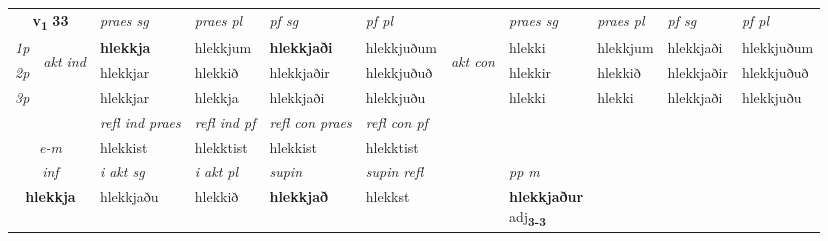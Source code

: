 \noindent
\begin{tabular}{lllllllllll} \toprule
\multicolumn{2}{c}{\textbf{v{\textsubscript{1}}} \Large{\textbf{33}}}  &  \textit{praes sg}  & \textit{praes pl}  &\textit{ pf sg} & \textit{pf pl} &  &  \textit{praes sg}  & \textit{praes pl}  & \textit{pf sg} & \textit{pf pl } \\*
	\cmidrule{3-6} \cmidrule{8-11}
 {\textit{1p}} & \multirow{3}{*}{\begin{turn}{90}\textit{akt ind}\end{turn}} & \textbf{hlekkja} & hlekkjum & \textbf{hlekkjaði} & hlekkjuðum & \multirow{3}{*}{\begin{turn}{90}\textit{akt con}\end{turn}} &hlekki & hlekkjum & hlekkjaði & hlekkjuðum\\*
 {\textit{2p}} &  &  hlekkjar  & hlekkið & hlekkjaðir & hlekkjuðuð & & hlekkir & hlekkið & hlekkjaðir & hlekkjuðuð \\*
{\textit{3p}} &  & hlekkjar & hlekkja & hlekkjaði & hlekkjuðu & & hlekki & hlekki& hlekkjaði & hlekkjuðu \\*
\cmidrule{3-6} \cmidrule{8-11}

 & & \textit{refl ind praes} & \textit{refl ind pf} & \textit{refl con praes} & \textit{refl con pf} \\*
 \multicolumn{2}{c}{ \textit{e-m} }& hlekkist & hlekktist & hlekkist & hlekktist \\*

\cmidrule{3-8}
   \multicolumn{2}{c}{\textit{inf}}  & \textit{i akt sg} & \textit{i akt pl}    & \textit{supin} & \textit{supin refl} && \textit{pp m} \\*
  \multicolumn{2}{c}{\textbf{hlekkja}} & hlekkjaðu  & hlekkið    &  \textbf{hlekkjað} & hlekkst && \specialcell{\textbf{hlekkjaður} \\ adj\textbf{\textsubscript{3-3}}} \\*
\end{tabular}


